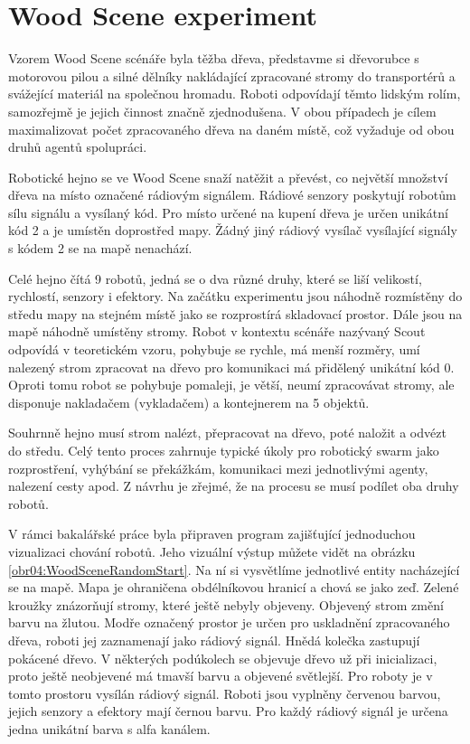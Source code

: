 \section{Wood Scene experiment}
Vzorem Wood Scene scénáře byla těžba dřeva, představme si dřevorubce s motorovou pilou a silné dělníky nakládající zpracované stromy do transportérů a svážející materiál na společnou hromadu. Roboti odpovídají těmto lidským rolím, samozřejmě je jejich činnost značně zjednodušena. V obou případech je cílem maximalizovat počet zpracovaného dřeva na daném místě, což vyžaduje od obou druhů agentů spolupráci. \par
Robotické hejno se ve Wood Scene snaží natěžit a převést, co největší množství dřeva na místo označené rádiovým signálem. Rádiové senzory poskytují robotům sílu signálu a vysílaný kód. Pro místo určené na kupení dřeva je určen unikátní kód 2 a je umístěn doprostřed mapy. Žádný jiný rádiový vysílač vysílající signály s kódem 2 se na mapě nenachází.  
\par
Celé hejno čítá 9 robotů, jedná se o dva různé druhy, které se liší velikostí, rychlostí, senzory i efektory. Na začátku experimentu jsou náhodně rozmístěny do středu mapy na stejném místě jako se rozprostírá skladovací prostor. Dále jsou na mapě náhodně umístěny stromy. Robot v kontextu scénáře nazývaný Scout odpovídá  v teoretickém vzoru, pohybuje se rychle, má menší rozměry, umí nalezený strom zpracovat na dřevo pro komunikaci má přidělený unikátní kód 0. Oproti tomu robot  se pohybuje pomaleji, je větší, neumí zpracovávat stromy, ale disponuje nakladačem (vykladačem) a kontejnerem na 5 objektů. 
 \par 
Souhrnně hejno musí strom nalézt, přepracovat na dřevo, poté naložit a odvézt do středu. Celý tento proces zahrnuje typické úkoly pro robotický swarm jako rozprostření, vyhýbání se překážkám, komunikaci mezi jednotlivými agenty, nalezení cesty apod. Z návrhu je zřejmé, že na procesu se musí podílet oba druhy robotů.
\par
V rámci bakalářské práce byla připraven program zajišťující jednoduchou vizualizaci chování robotů. Jeho vizuální výstup můžete vidět na obrázku \ref{obr04:WoodSceneRandomStart}. Na ní si vysvětlíme jednotlivé entity nacházející se na mapě. Mapa je ohraničena obdélníkovou hranicí a chová se jako zeď. Zelené kroužky znázorňují stromy, které ještě nebyly objeveny. Objevený strom změní barvu na žlutou. Modře označený prostor je určen pro uskladnění zpracovaného dřeva, roboti jej zaznamenají jako rádiový signál. Hnědá kolečka zastupují pokácené dřevo. V některých podúkolech se objevuje dřevo už při inicializaci, proto ještě neobjevené má tmavší barvu a objevené světlejší. Pro roboty je v tomto prostoru vysílán rádiový signál. Roboti jsou vyplněny červenou barvou, jejich senzory a efektory mají černou barvu. Pro každý rádiový signál je určena jedna unikátní barva s alfa kanálem. 
